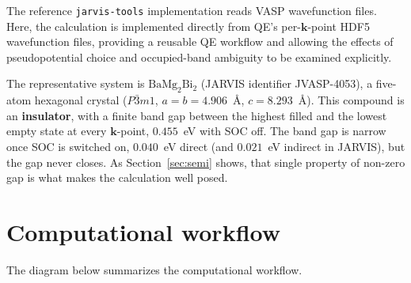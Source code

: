 \documentclass[11pt]{article}
\newcommand{\kk}{\mathbf{k}}
\newcommand{\bmb}{\mathrm{BaMg_2Bi_2}}
\begin{document}
The reference \texttt{jarvis-tools} implementation reads VASP wavefunction files. Here, the
calculation is implemented directly from QE's per-$\kk$-point HDF5 wavefunction files, providing a
reusable QE workflow and allowing the effects of pseudopotential choice and occupied-band ambiguity
to be examined explicitly.

The representative system is $\bmb$ (JARVIS identifier JVASP-4053), a five-atom hexagonal crystal
($P\bar{3}m1$, $a=b=4.906$~\AA, $c=8.293$~\AA). This compound is an \textbf{insulator}, with a finite band gap
between the highest filled and the lowest empty state at every $\kk$-point, $0.455$~eV with SOC off.
The band gap is narrow once SOC is switched on, $0.040$~eV direct (and $0.021$~eV indirect in
JARVIS), but the gap never closes. As Section~\ref{sec:semi} shows, that single property of non-zero
gap is what makes the calculation
well posed.

\section{Computational workflow}

The diagram below summarizes the computational workflow.
\end{document}
